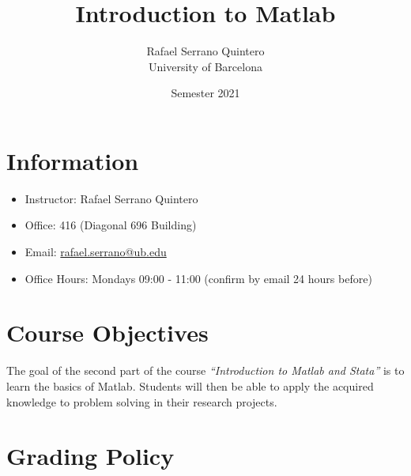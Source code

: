 \documentclass[a4paper,12pt]{article}
\begin{document}

\title{\textbf{Introduction to Matlab}}
\author{Rafael Serrano Quintero \\
University of Barcelona}
\date{ Semester 2021}

\maketitle

\section{Information}

\begin{itemize}
    \item Instructor: Rafael Serrano Quintero
    \item Office: 416 (Diagonal 696 Building)
    \item Email: \href{mailto:rafael.serrano@ub.edu}{rafael.serrano@ub.edu}
    \item Office Hours: Mondays 09:00 - 11:00 (confirm by email 24 hours before)
\end{itemize}

\section{Course Objectives}

The goal of the second part of the course \textit{``Introduction to Matlab and Stata''} is to learn the basics of Matlab. Students will then be able to apply the acquired knowledge to problem solving in their research projects.

\section{Grading Policy}
\end{document}
